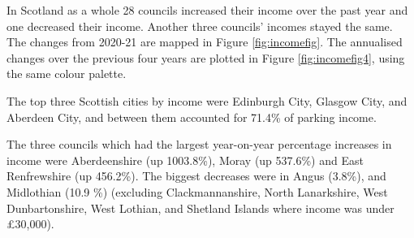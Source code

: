 \documentclass[
  12pt,
]{article}
\begin{document}
In Scotland as a whole 28 councils increased their income over the past year and one decreased their income. Another three councils' incomes stayed the same.
The changes from 2020-21 are mapped in Figure \ref{fig:incomefig}. The annualised changes over the previous four years are plotted in Figure \ref{fig:incomefig4}, using the same colour palette.

The top three Scottish cities by income were Edinburgh City, Glasgow City, and Aberdeen City, and between them accounted for 71.4\% of parking income.

The three councils which had the largest year-on-year percentage increases in income were Aberdeenshire (up 1003.8\%), Moray (up 537.6\%) and East Renfrewshire (up 456.2\%).
The biggest decreases were in Angus (3.8\%), and Midlothian (10.9 \%) (excluding Clackmannanshire, North Lanarkshire, West Dunbartonshire, West Lothian, and Shetland Islands where income was under £30,000).

\begingroup\fontsize{9}{11}\selectfont
\end{document}
